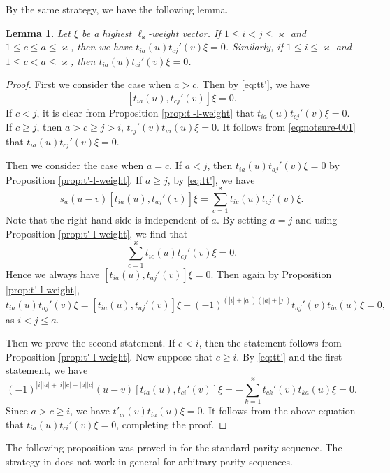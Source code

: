 \documentclass[11pt,reqno]{amsart}
\numberwithin{equation}{section}
\newtheorem{lem}[thm]{Lemma}
\theoremstyle{definition}
\theoremstyle{remark}
\newcommand{\beq}{\begin{equation}}
\newcommand{\eeq}{\end{equation}}
\newcommand{\gge}{\geqslant}
\newcommand{\lle}{\leqslant}
\newcommand{\ka}{\varkappa}
\newcommand{\s}{{\bm s}}
\begin{document}
By the same strategy, we have the following lemma.

\begin{lem}\label{lem:tia-kill}
Let $\xi$ be a highest $\ell_\s$-weight vector. If $1\lle i <j\lle \ka$ and $1\lle c\lle a\lle \ka$,  then we have $t_{ia}(u)t_{cj}'(v)\xi= 0$. Similarly, if $1\lle i\lle \ka$ and $1\lle c <a \lle \ka$, then $t_{ia}(u)t_{ci}'(v)\xi =0$.
\end{lem}
\begin{proof}
First we consider the case when $a>c$. Then by \eqref{eq:tt'}, we have
\beq\label{eq:notsure-001}
[t_{ia}(u),t_{cj}'(v)]\xi=0.
\eeq
If $c < j$, it is clear from Proposition \ref{prop:t'-l-weight} that $t_{ia}(u)t_{cj}'(v)\xi= 0$. If $c\gge j$, then $a>c \gge j >i$, $t_{cj}'(v)t_{ia}(u)\xi=0$. It follows from \eqref{eq:notsure-001} that $t_{ia}(u)t_{cj}'(v)\xi= 0$.

Then we consider the case when $a=c$. If $a <j$, then $t_{ia}(u)t_{aj}'(v)\xi= 0$ by Proposition \ref{prop:t'-l-weight}. If $a\gge j$, by \eqref{eq:tt'}, we have
$$
s_a(u-v)[t_{ia}(u),t_{aj}'(v)]\xi=\sum_{c=1}^\ka t_{ic}(u)t_{cj}'(v)\xi.
$$
Note that the right hand side is independent of $a$. By setting $a=j$ and using Proposition \ref{prop:t'-l-weight}, we find that $$\sum_{c=1}^\ka t_{ic}(u)t_{cj}'(v)\xi=0.$$Hence we always have $[t_{ia}(u),t_{aj}'(v)]\xi=0$. Then again by Proposition \ref{prop:t'-l-weight},
\[
t_{ia}(u)t_{aj}'(v)\xi =[t_{ia}(u),t_{aj}'(v)]\xi + (-1)^{(|i|+|a|)(|a|+|j|)}t_{aj}'(v)t_{ia}(u)\xi =0,
\]
as $i<j\lle a$. 

Then we prove the second statement. If $c<i$, then the statement follows from Proposition \ref{prop:t'-l-weight}. Now suppose that $c\gge i$. By \eqref{eq:tt'} and the first statement, we have
\[
(-1)^{|i||a|+|i||c|+|a||c|}(u-v)[t_{ia}(u),t_{ci}'(v)]\xi=-\sum_{k=1}^\ka t_{ck}'(v)t_{ka}(u)\xi=0.
\]
Since $a>c\gge i$, we have $t'_{ci}(v)t_{ia}(u)\xi=0$. It follows from the above equation that $t_{ia}(u)t_{ci}'(v)\xi=0$, completing the proof.
\end{proof}

The following proposition was proved in \cite{Ragoucy2007analytical,Belliard2009nested} for the standard parity sequence. The strategy in \cite{Ragoucy2007analytical,Belliard2009nested} does not work in general for arbitrary parity sequences.
\end{document}
